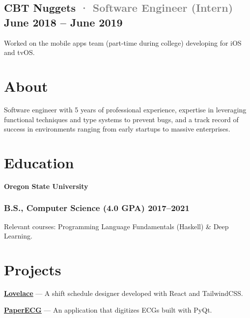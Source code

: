 \documentclass[10pt]{article} %
\let\defaultref\href
\renewcommand{\href}[2]{%
  \defaultref{#1}{\ul{#2}}%
}
\renewcommand{\emph}[1]{%
  \textcolor{gray}{#1}%
}
\begin{document}
\begin{paracol}{2}
\hypertarget{cbt-nuggets-software-engineer-intern-june-2018-june-2019}{%
\subsection{\texorpdfstring{CBT Nuggets \emph{· \small Software Engineer
(Intern)} \hfill \small June 2018 -- June
2019}{CBT Nuggets · Software Engineer (Intern) June 2018 -- June 2019}}\label{cbt-nuggets-software-engineer-intern-june-2018-june-2019}}

Worked on the mobile apps team (part-time during college) developing for
iOS and tvOS.

\switchcolumn

\hypertarget{about}{%
\section{About}\label{about}}

Software engineer with 5 years of professional experience, expertise in
leveraging functional techniques and type systems to prevent bugs, and a
track record of success in environments ranging from early startups to
massive enterprises.

\raggedright

\hypertarget{education}{%
\section{Education}\label{education}}

\textbf{Oregon State University}

\hypertarget{b.s.-computer-science-4.0-gpa-20172021}{%
\subsubsection{B.S., Computer Science (4.0 GPA)
2017--2021}\label{b.s.-computer-science-4.0-gpa-20172021}}

Relevant courses: Programming Language Fundamentals (Haskell) \& Deep
Learning.

\hypertarget{projects}{%
\section{Projects}\label{projects}}

\textbf{\href{http://julianfortune.com/lovelace/}{Lovelace}} --- A shift
schedule designer developed with React and TailwindCSS.

\textbf{\href{https://github.com/Tereshchenkolab/paper-ecg}{PaperECG}}
--- An application that digitizes ECGs built with PyQt.


\end{paracol}
\end{document}
